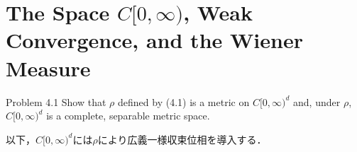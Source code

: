 \section{The Space $C[0,\infty)$, Weak Convergence, and the Wiener Measure}
	\begin{itembox}[l]{Problem 4.1}
		Show that $\rho$ defined by (4.1) is a metric on $C[0,\infty)^d$ and, under $\rho$, 
		$C[0,\infty)^d$ is a complete, separable metric space.
	\end{itembox}
	以下，$C[0,\infty)^d$には$\rho$により広義一様収束位相を導入する．
	
\begin{comment}
\begin{prf}完備性と可分性を示す．
	\begin{description}
		\item[完備性]
			$C[0,\infty)^d$から任意にCauchy列$(w_n)_{n=1}^{\infty}$を取る．任意の$\epsilon > 0$に対して
			或る$N \in \N$が取れて，$n,m > N$ならば$d(w_n,w_m) < \epsilon$が成り立つのであるから，距離関数の各項では
			$\sup{t \leq k}{|w_n(t) - w_m(t)|} < 2^k \epsilon\ (k=1,2,\cdots)$が成立している．
			$\epsilon$は任意であるから$(w_n)_{n=1}^{\infty}$は各点でCauchy列をなし，実数の完備性から
			各$t \in [0,\infty)$で$(w(t))_{n=1}^{\infty}$は$\R^d$で収束する．収束先を$w(t)\ (\forall t \in [0,\infty))$と
			表して極限関数$w$を定義すれば$w$は連続である．
			実際任意の$s \in [0, \infty)$に対し$s < k$となるように$k \in \N$を取れば，$t \leq k$の範囲で
			\begin{align}
				\sup{t \leq k}{|w_n(t) - w_m(t)|} \quad (n,m=1,2,\cdots)
			\end{align}
			がCauchy列をなしているから，任意の$\epsilon > 0$に対して或る$N \in \N$が存在し，$n,m > N$で
			\begin{align}
				\sup{t \leq k}{|w_n(t) - w_m(t)|} < \epsilon
			\end{align}
			となる．特に$w_m(t) \longrightarrow w(t)$であることを併せれば，各点$t \leq k$において
			$|w_n(t) - w(t)| \leq \epsilon$となるから
			\footnote{
				$\left| |w_n(t) - w(t)| - |w_n(t) - w_m(t)| \right| \leq |w_m(t) - w(t)|$で右辺をいくらでも小さくできるから，
				$|w_n(t) - w(t)| > \epsilon$であると矛盾する．
			}
			\begin{align}
				\sup{t \leq k}{|w_n(t) - w(t)|} \leq \epsilon
			\end{align}
			が成り立つ．連続関数列が一様収束しているから$w$は$s$で連続である．
			各点での連続性が示され，$w \in C[0,\infty)^d$であると判る．
		\item[可分性]

\end{comment}
